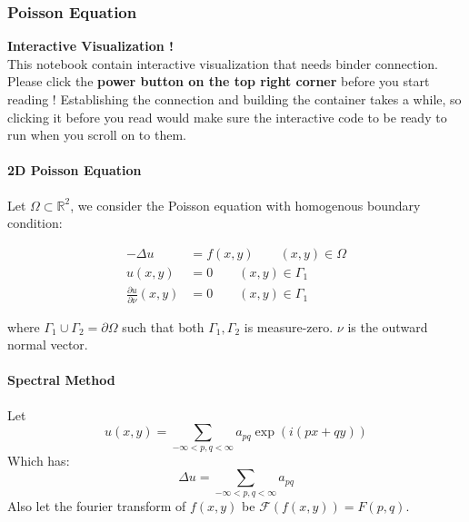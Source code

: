 \subsubsection{Poisson Equation}

%
\providecommand{\argmin}{\operatorname*{arg\,min}}%
\providecommand{\argmax}{\operatorname*{arg\,max}}%
\begin{framed}
\textbf{Interactive Visualization !}\\
This notebook contain interactive visualization that needs binder connection. Please click the \textbf{power button on the top right corner} before you start reading ! Establishing the connection and building the container takes a while, so clicking it before you read would make sure the interactive code to be ready to run when you scroll on to them.
\end{framed}

\paragraph{2D Poisson Equation}

Let $\Omega \subset \mathbb{R}^2$, we consider the Poisson equation with homogenous boundary condition:

\begin{definition}\begin{equation}
\label{2dpoihb}
\begin{aligned}
-\Delta u &= f(x,y) \qquad (x,y)\in \Omega \\
  u(x,y) &= 0 \qquad (x,y)\in \Gamma_1 \\
  \frac{\partial u}{\partial \nu}(x,y) &= 0 \qquad (x,y)\in \Gamma_1
\end{aligned}
\end{equation}

\end{definition}where $\Gamma_1\cup \Gamma_2 = \partial \Omega$ such that both $\Gamma_1, \Gamma_2$ is measure-zero. $\nu$ is the outward normal vector.

\paragraph{Spectral Method}

Let
\begin{equation}
u(x,y)=\sum_{-\infty<p,q<\infty} a_{pq}  \exp(i(px +qy))
\end{equation}
Which has:
\begin{equation}
\Delta u = \sum_{-\infty<p,q<\infty} a_{pq}
\end{equation}
Also let the fourier transform of $f(x,y)$ be $\mathcal F (f(x,y))=F(p,q)$.

